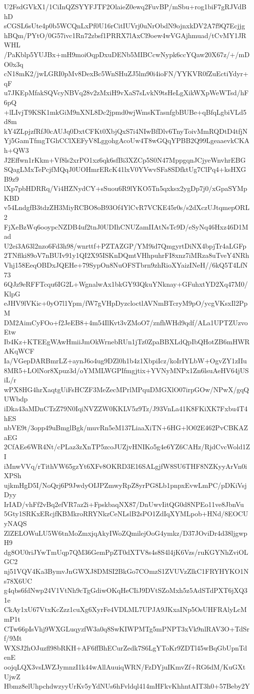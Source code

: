 U2FsdGVkX1/1CiInQZSYYFJTF2OlaieZ0ewq2FuvBP/mSbu+rog1biF7gRJVdBhD
sCGSL6sUte4p0b5WCQnLxPf0U16rCitIUVrj0uNrObdN9ojnxkDV2A7f9Q7Ecjjg
hBQm/PYtO/0G57ivc1Rn72zbsf1PRRX7lAxCl9oew4wVGAjhmuad/tCvMY1JRWHL
/PaKblp5YUJBx+mH9moiOqpDxuDENb5MIBCcwNypk6ccYQaw20X67z/+/mDO0x3q
cN18mK2/jwLGRI0pMv8DexBc5WnSHuZJ5lm90i4ioFN/YYKVR0fZuEctiYdyr+qF
u7JKEpMfakSQVcyNBVq28v2zMxiH9vXaS7sLvkN9tsHeLgXikWXpWeWTsd/hF6pQ
+lLIvjT9KSK1mkGiM9nXNL8Dc2jpmd0wjWmsKTasnfgbBUBe+qBfqLgbiVLd5d8m
kY4ZLpjzfRfJ0cAUJq0DxtCFKt0XbjQxS7i4NIwBfDlv6TnyToivMmRQDtD4tfjN
Yj5GamTfmgTGhCClXEFyV8LggohgAcoUw4T8wGQqYPBB2Q99LgeaaevkCKAh+QW3
J2Effwn1rKkm+Vf8ls2xrPO1xz6qk6sfBi3XZCp5S0N47MppgqnJCjyeWnvhrEBG
SQagLMxTePcjfMQqJ0UOHmrERcK41lxV0YVwvSFa8SDfktUg7ClPq4+ksHXGB9z9
lXp7pbHDRRq/Vi4HZNydCY+sSuou6R9lYKO5Tn5qxksx2ygDp7j0/xGpaSYMpKBD
v54LndgfB3tdzZH3MiyRCBO8oB93Of4YlCvR7VCKE45r0s/s2dXczUJtqmepORL2
FjXeBzWq6ooypcNZDB4uf2tnJ0UDIhCNUZamIIAtNsTc9D/eSyNq46Hxz46D1Mad
U2ei3A63l2nzo6Fd3h98/wnrttf+PZTAZGP/YM9id7QmgyrtDiNX4bpjTr4aLGFp
2TNflki89oV7nBUIv91y1QI2X95ISKnDQmtVHhpuhrFI8xnz7iMRza8uTveY4NRh
Vhj158EeqOBDxJQEHe+79SypOn8NuOFSTbrn9zhRioXYaizINeH//6kQ5T4LfN73
6QJz9eRFFTcqu6IG2L+WgnalwAx1bkGY93QkuYNknay+GFuhxtYD2Xq47M0/KlpG
eJHV9lVKic+0yO7l1Ypm/fW7gVHpDyzcloctlAVNmBTcryM9pO/ycgVKsxIl2PpM
DM2AimCyFOo+f2JeEB8+4m54IlKvt3vZMoO7/znfhWHd9qdf/ALa1UPTZUzvoEtw
Ib4Kz+KTEEgWAwHmiiJmOkWrnebRUn1jTz0ZpaBBXLdQpIbQHotZB6mHWRAKqWCF
Ia/VGepDARBmrLZ+aynJ6o4ug9DZl0h1b4z1XbpiIcz/koIrIYLbW+OgvZY1zIIu
8MR5+LOlNor8Xpuz3d/oYMMLWGPIfmgjtix+YVNyMNPx1Zn6lsuAeHV64jUSiL/r
wPX8HG4hrXaqtgUiFsHCZF3MeZecMPrlMPquDMGXlO07irpGOw/NPwX/gqQUWbdp
iDka43aMDnCTzZ79N0IqiNVZZW0KKLV5z9Tz/J93VnLa41K8FKiXK7Fxbu4T4hES
nbVE9t/3opp49uBmglBgk/muvRn5eM137LiaaXiTN+6HG+lO02E462PvCBKAZaEG
2CfAEe6WR4Nt/cPLaz3zXnTP5zcoJUZjvHNIKo5g4e6YZ6CAHz/RjdCvcWold1ZI
iMnwVVq/rTithVW65gzYt6XFv8OKRD3E16SALgjfW8SU6THF8NZKyyArVn0iXPSh
ujkmHgD5I/NoQrj6P9JwdyOIJPZmwyRpZ8yrPG8Lb1pnpxEvwLmPC/pDKiVsjDyy
IrIAD/vhFf2vBq2efVR7az2i+FpskbaqNX87/DnUwvIitQG0d8NPEo11ve8JbnVu
5Gty1SRKxERcjfKBMkroRRYNkzCeNLslB2sPO1ZdIqXYMLpob+HNd/8EOCUyNAQS
ZlZELOWuLU5W6tnMoZmxjqAkyIWoZQmilejOoG4ymkz/D37JOviDr4d38ljgwpH9
dg8OU0riJYwTmUqp7QM36GemPpZT0dXTV8s4s8S4l4jK6Vzs/ruKGYNhZviOLGC2
nj51VQV4Ka3BymvJnGWXJ8DMSI2BkGo7COmzS1ZVUVzZlkC1FRYHYKO1Ns78X6UC
g4qbs6fdNwp24V1VtNh9cTgGdiwOKqHeCIiJ9DVtSZoMxh5z5AdSTdPXT6jXQ31e
CkAy1xU67VtxKcZzz1cuXg6XyrFe4VDLML7UPJA9JKxaINp5OsUHFRAlyLcMmP1t
CTw66pIsVhj9WXGLuqyzfW3a0q8SwKIWPMTg5mPNPT3xVk9nlRAV3O+TdSrf/9Mt
WXSJ2hOJuzfl98bRKH+AF6ffBhECurZedk7S6LgYToKr9ZDTl45wBqGbUpnTdenE
oojqLQX3vsLWZJymnzI1k44wAllAuuiqWRN/FzDYjuIKmvZf+RG6dM/KuGXtUjwZ
Hbmz8elUhpchdwzyyUrKv5yYdNUs6hFvldql414mHFkvKhhntAIT3h0+57Beby2Y
